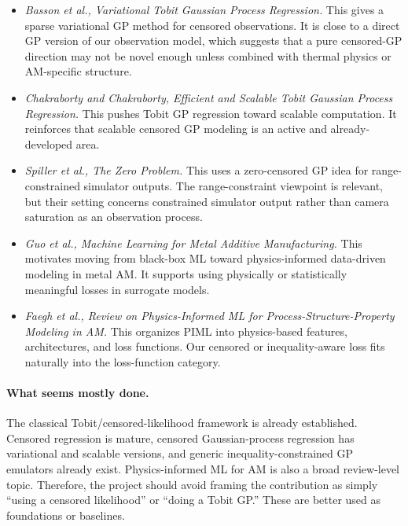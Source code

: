 \begin{itemize}
    \item \textit{Basson et al., Variational Tobit Gaussian Process Regression.}
    This gives a sparse variational GP method for censored observations. It is close to a direct GP version of our observation model, which suggests that a pure censored-GP direction may not be novel enough unless combined with thermal physics or AM-specific structure.

    \item \textit{Chakraborty and Chakraborty, Efficient and Scalable Tobit Gaussian Process Regression.}
    This pushes Tobit GP regression toward scalable computation. It reinforces that scalable censored GP modeling is an active and already-developed area.

    \item \textit{Spiller et al., The Zero Problem.}
    This uses a zero-censored GP idea for range-constrained simulator outputs. The range-constraint viewpoint is relevant, but their setting concerns constrained simulator output rather than camera saturation as an observation process.

    \item \textit{Guo et al., Machine Learning for Metal Additive Manufacturing.}
    This motivates moving from black-box ML toward physics-informed data-driven modeling in metal AM. It supports using physically or statistically meaningful losses in surrogate models.

    \item \textit{Faegh et al., Review on Physics-Informed ML for Process-Structure-Property Modeling in AM.}
    This organizes PIML into physics-based features, architectures, and loss functions. Our censored or inequality-aware loss fits naturally into the loss-function category.
\end{itemize}

\paragraph{What seems mostly done.}
The classical Tobit/censored-likelihood framework is already established. Censored regression is mature, censored Gaussian-process regression has variational and scalable versions, and generic inequality-constrained GP emulators already exist. Physics-informed ML for AM is also a broad review-level topic. Therefore, the project should avoid framing the contribution as simply ``using a censored likelihood'' or ``doing a Tobit GP.'' These are better used as foundations or baselines.

